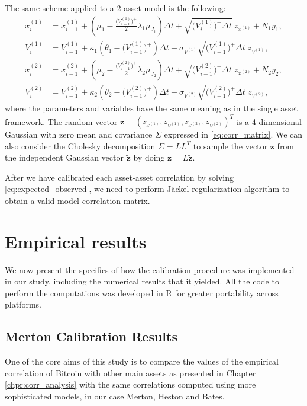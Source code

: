 The same scheme applied to a  2-asset model is the following:
\begin{subequations}
	\label{eq:bates_full_truncation2}
	\begin{align}
	x_i^{(1)} &= x_{i-1}^{(1)} + (\mu_1 -  \frac{\Big(V_{i-1}^{(1)}\Big)^+}{2} \lambda_1\mu_{J_1})\Delta t + \sqrt{\Big(V_{i-1}^{(1)}\Big)^+ \Delta t} \:z_{x^{(1)}} + N_1 y_1, \\
	V_i^{(1)} &= V_{i-1}^{(1)} + \kappa_1(\theta_1 - \Big(V_{i-1}^{(1)}\Big)^+ )\Delta t + \sigma_{V^{(1)}} \sqrt{\Big(V_{i-1}^{(1)}\Big)^+ \Delta t} \: z_{V^(1)},\\
	x_i^{(2)} &= x_{i-1}^{(2)} + (\mu_2 -  \frac{\Big(V_{i-1}^{(2)}\Big)^+}{2} \lambda_2 \mu_{J_2})\Delta t + \sqrt{\Big(V_{i-1}^{(2)}\Big)^+\Delta t} \:z_{x^{(2)}} + N_2 y_2, \\
	V_i^{(2)} &= V_{i-1}^{(2)} + \kappa_2(\theta_2 - \Big(V_{i-1}^{(2)}\Big)^+ )\Delta t + \sigma_{V^{(2)}} \sqrt{\Big(V_{i-1}^{(2)}\Big)^+ \Delta t} \: z_{V^{(2)}},
	\end{align}
\end{subequations}
where the parameters and variables have the same meaning as in the single asset framework.
The random vector $\mathbf{z} = (z_{x^{(1)}}, z_{V^{(1)}}, z_{x^{(2)}}, z_{V^{(2)}})^T$ is a 4-dimensional Gaussian with zero mean and covariance $\Sigma$ expressed in \eqref{eq:corr_matrix}. We can also consider the Cholesky decomposition $\Sigma= L L^T$ to sample the vector $\mathbf{z}$ from the independent Gaussian vector $\mathbf{\tilde{z}}$ by doing $\mathbf{z} = L \mathbf{\tilde{z}}$.

After we have calibrated each asset-asset correlation by solving \eqref{eq:expected_observed}, we need to perform J\"ackel regularization algorithm to obtain a valid model correlation matrix.

\bigskip
\section{Empirical results}
\label{sec:results_cal}
We now present the specifics of how the calibration procedure was implemented in our study, including the numerical results that it yielded.
All the code to perform the computations was developed in R for greater portability across platforms.

\subsection{Merton Calibration Results}
One of the core aims of this study is to compare the values of the empirical correlation of Bitcoin with other main assets as presented in Chapter \ref{chpr:corr_analysis} with the same correlations computed using more sophisticated models, in our case Merton, Heston and Bates.

